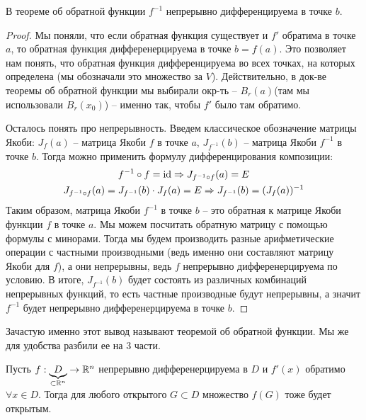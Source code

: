 \begin{follow}
    В теореме об обратной функции $f^{-1}$ непрерывно дифференцируема в точке $b$.
\end{follow}
\begin{proof}
    Мы поняли, что если обратная функция существует и $f'$ обратима в точке $a$, то обратная функция дифференерцируема в точке $b = f(a)$.
    Это позволяет нам понять, что обратная функция дифференцируема во всех точках, на которых определена (мы обозначали это множество за $V$).
    Действительно, в док-ве теоремы об обратной функции мы выбирали окр-ть -- $B_r(a)$(там мы использовали $B_r(x_0)$) -- именно так, чтобы $f'$ было там обратимо.
    
    \quad Осталось понять про непрерывность. 
    Введем классическое обозначение матрицы Якоби: $J_f(a)$ -- матрица Якоби $f$ в точке $a$, $J_{f^{-1}}(b)$ -- матрица Якоби $f^{-1}$ в точке $b$.
    Тогда можно применить формулу дифференцирования композиции:
    \begin{gather*}
        f^{-1} \circ f = \operatorname{id} \Rightarrow J_{f^{-1} \circ f}(a) = E \\
        J_{f^{-1} \circ f}(a) = J_{f^{-1}}(b) \cdot J_f(a) = E \Rightarrow J_{f^{-1}}(b) = (J_f(a))^{-1} 
    \end{gather*}
    \quad Таким образом, матрица Якоби $f^{-1}$ в точке $b$ -- это обратная к матрице Якоби функции $f$ в точке $a$.
    Мы можем посчитать обратную матрицу с помощью формулы с минорами.
    Тогда мы будем производить разные арифметические операции с частными производными (ведь именно они составляют матрицу Якоби для $f$), а они непрерывны, ведь $f$ непрерывно дифференерцируема по условию.
    В итоге, $J_{f^{-1}}(b)$ будет состоять из различных комбинаций непрерывных функций, то есть частные производные будут непрерывны, а значит  $f^{-1}$ будет непрерывно дифференерцируема в точке $b$.
\end{proof}

\begin{notice}
    Зачастую именно этот вывод называют теоремой об обратной функции.
    Мы же для удобства разбили ее на 3 части.
\end{notice}

\vspace*{7mm}

\begin{follow}
    Пусть $f: \underbrace{D}_{\subset \mathbb{R}^n} \to \mathbb{R}^n$ непрерывно дифференерцируема в $D$ и $f'(x)$ обратимо $\forall x \in D$.
    Тогда для любого открытого $G \subset D$ множество $f(G)$ тоже будет открытым.
\end{follow}

